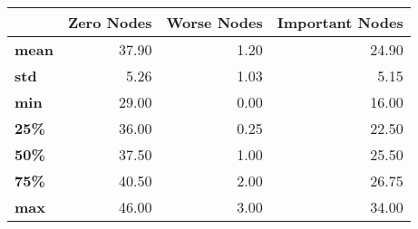 \begin{tabular}{lrrr}
\toprule
{} &  Zero Nodes &  Worse Nodes &  Important Nodes \\
\midrule
\textbf{mean} &       37.90 &         1.20 &            24.90 \\
\textbf{std } &        5.26 &         1.03 &             5.15 \\
\textbf{min } &       29.00 &         0.00 &            16.00 \\
\textbf{25\% } &       36.00 &         0.25 &            22.50 \\
\textbf{50\% } &       37.50 &         1.00 &            25.50 \\
\textbf{75\% } &       40.50 &         2.00 &            26.75 \\
\textbf{max } &       46.00 &         3.00 &            34.00 \\
\bottomrule
\end{tabular}
